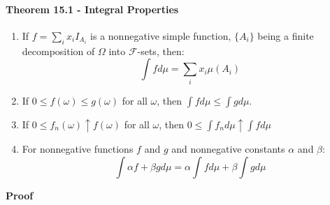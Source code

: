 \documentclass[12pt,a4paper]{article}
\newcommand{\1}[1]{\mathbbm{1}\left\{ #1 \right\}}
\newcommand{\fcal}{\mathcal{F}}
\begin{document}
\paragraph{Theorem 15.1 - Integral Properties}
\begin{enumerate}
	\item If $f = \sum_i x_i I_{A_i}$ is a nonnegative simple function, $\{A_i\}$ being a finite decomposition of $\Omega$ into $\fcal$-sets, then:
	$$
		\int f d\mu = \sum_i x_i \mu(A_i)
	$$
	
	\item If $0 \leq f(\omega) \leq g(\omega)$ for all $\omega$, then $\int f d\mu \leq \int g d\mu$. 
	
	\item If $0 \leq f_n(\omega) \uparrow f(\omega)$ for all $\omega$, then $0 \leq \int f_n d\mu \uparrow \int f d\mu$
	
	\item For nonnegative functions $f$ and $g$ and nonnegative constants $\alpha$ and $\beta$:
	$$
		\int \alpha f + \beta g d\mu = \alpha \int f d\mu + \beta \int g d\mu
	$$
\end{enumerate}
\textbf{Proof}
\end{document}
